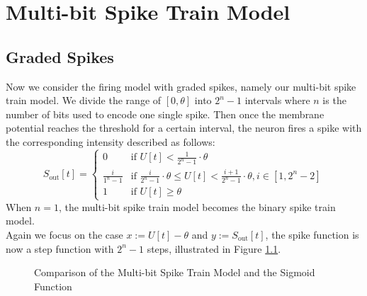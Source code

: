\chapter{Multi-bit Spike Train Model}
\label{chap:multi-bit-spike-train-model}

\section{Graded Spikes}
\label{sec:graded-spikes}
    Now we consider the firing model with graded spikes, namely our multi-bit spike train model. We divide the range of $[0, \theta]$ into
    $2^n-1$ intervals where $n$ is the number of bits used to encode one single spike. Then once the membrane potential reaches the threshold 
    for a certain interval, the neuron fires a spike with the corresponding intensity described as follows:
    \begin{equation}
        S_{\text{out}}[t] = \begin{cases}
            0               & \text{if } U[t] < \frac{1}{2^n-1}\cdot\theta \\
            \frac{i}{1^n-1} & \text{if } \frac{i}{2^n-1}\cdot\theta \leq U[t] < \frac{i+1}{2^n-1}\cdot\theta, i\in [1, 2^n-2]\\
            1               & \text{if } U[t] \geq \theta
        \end{cases}
    \end{equation}
    When $n = 1$, the multi-bit spike train model becomes the binary spike train model. \\
    Again we focus on the case $x := U[t] - \theta$ and $y := S_{\text{out}}[t]$, the spike function is now a step function with $2^n-1$ steps, illustrated in Figure \ref{fig:multi-bit-spike_sigmoid}. 
    \begin{figure}[!htpb]
        \centering
        \caption{Comparison of the Multi-bit Spike Train Model and the Sigmoid Function}
        \label{fig:multi-bit-spike_sigmoid}
    \end{figure}

